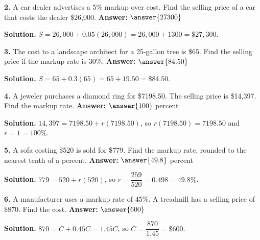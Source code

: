 \documentclass{ximera}
\begin{document}
\begin{problem}
\textbf{2.} A car dealer advertises a $5\%$ markup over cost. Find the selling price of a
car that costs the dealer \$26,000. \qquad \textbf{Answer:} $\answer{27300}$

\begin{hint}
\textbf{Solution.} $S=26{,}000+0.05(26{,}000)=26{,}000+1300=\$27{,}300$.
\end{hint}
\end{problem}

\begin{problem}
\textbf{3.} The cost to a landscape architect for a 25-gallon tree is \$65. Find the
selling price if the markup rate is $30\%$. \qquad \textbf{Answer:} $\answer{84.50}$

\begin{hint}
\textbf{Solution.} $S=65+0.3(65)=65+19.50=\$84.50$.
\end{hint}
\end{problem}

\begin{problem}
\textbf{4.} A jeweler purchases a diamond ring for \$7198.50. The selling price is
\$14,397. Find the markup rate. \qquad \textbf{Answer:} $\answer{100}$ percent

\begin{hint}
\textbf{Solution.} $14{,}397=7198.50+r(7198.50)$, so $r(7198.50)=7198.50$ and $r=1=100\%$.
\end{hint}
\end{problem}

\begin{problem}
\textbf{5.} A sofa costing \$520 is sold for \$779. Find the markup rate, rounded to the
nearest tenth of a percent. \qquad \textbf{Answer:} $\answer{49.8}$ percent

\begin{hint}
\textbf{Solution.} $779=520+r(520)$, so $r=\dfrac{259}{520}=0.498=49.8\%$.
\end{hint}
\end{problem}

\begin{problem}
\textbf{6.} A manufacturer uses a markup rate of $45\%$. A treadmill has a selling price
of \$870. Find the cost. \qquad \textbf{Answer:} $\answer{600}$

\begin{hint}
\textbf{Solution.} $870=C+0.45C=1.45C$, so $C=\dfrac{870}{1.45}=\$600$.
\end{hint}
\end{problem}
\end{document}

